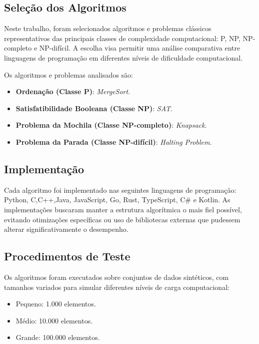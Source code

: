 \documentclass[12pt,oneside,a4paper]{report}
\begin{document}
\subsection{Seleção dos Algoritmos}

Neste trabalho, foram selecionados algoritmos e problemas clássicos representativos das principais classes de complexidade computacional: P, NP, NP-completo e NP-difícil. A escolha visa permitir uma análise comparativa entre linguagens de programação em diferentes níveis de dificuldade computacional.

Os algoritmos e problemas analisados são:

\begin{itemize}
    \item \textbf{Ordenação (Classe P)}: \textit{MergeSort}.
    
    \item \textbf{Satisfatibilidade Booleana (Classe NP)}: \textit{SAT}.
    
    \item \textbf{Problema da Mochila (Classe NP-completo)}: \textit{Knapsack}.
    
    \item \textbf{Problema da Parada (Classe NP-difícil)}: \textit{Halting Problem}.
\end{itemize}

\subsection{Implementação}

Cada algoritmo foi implementado nas seguintes linguagens de programação:
Python, C,C++,Java, JavaScript, Go, Rust, TypeScript, C\# e Kotlin.  
As implementações buscaram manter a estrutura algorítmica o mais fiel possível, evitando otimizações específicas ou uso de bibliotecas externas que pudessem alterar significativamente o desempenho.

\subsection{Procedimentos de Teste}

Os algoritmos foram executados sobre conjuntos de dados sintéticos, com tamanhos variados para simular diferentes níveis de carga computacional:

\begin{itemize}
    \item Pequeno: 1.000 elementos.
    \item Médio: 10.000 elementos.
    \item Grande: 100.000 elementos.
\end{itemize}
\end{document}

